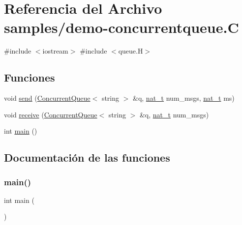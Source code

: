 \hypertarget{demo-concurrentqueue_8_c}{}\section{Referencia del Archivo samples/demo-\/concurrentqueue.C}
\label{demo-concurrentqueue_8_c}
{\ttfamily \#include $<$iostream$>$}\newline
{\ttfamily \#include $<$queue.\+H$>$}\newline
\subsection*{Funciones}
\begin{DoxyCompactItemize}
\item 
void \hyperlink{demo-concurrentqueue_8_c_aa97d75998c4e7c6e867a476cb2ac4fba}{send} (\hyperlink{class_designar_1_1_concurrent_queue}{Concurrent\+Queue}$<$ string $>$ \&q, \hyperlink{namespace_designar_aa72662848b9f4815e7bf31a7cf3e33d1}{nat\+\_\+t} num\+\_\+msgs, \hyperlink{namespace_designar_aa72662848b9f4815e7bf31a7cf3e33d1}{nat\+\_\+t} ms)
\item 
void \hyperlink{demo-concurrentqueue_8_c_ab141b5e3494a69e30757648ece395552}{receive} (\hyperlink{class_designar_1_1_concurrent_queue}{Concurrent\+Queue}$<$ string $>$ \&q, \hyperlink{namespace_designar_aa72662848b9f4815e7bf31a7cf3e33d1}{nat\+\_\+t} num\+\_\+msgs)
\item 
int \hyperlink{demo-concurrentqueue_8_c_ae66f6b31b5ad750f1fe042a706a4e3d4}{main} ()
\end{DoxyCompactItemize}


\subsection{Documentación de las funciones}
\mbox{\label{demo-concurrentqueue_8_c_ae66f6b31b5ad750f1fe042a706a4e3d4}} 
\subsubsection{\texorpdfstring{main()}{main()}}
{\footnotesize\ttfamily int main (\begin{DoxyParamCaption}{ }\end{DoxyParamCaption})}




